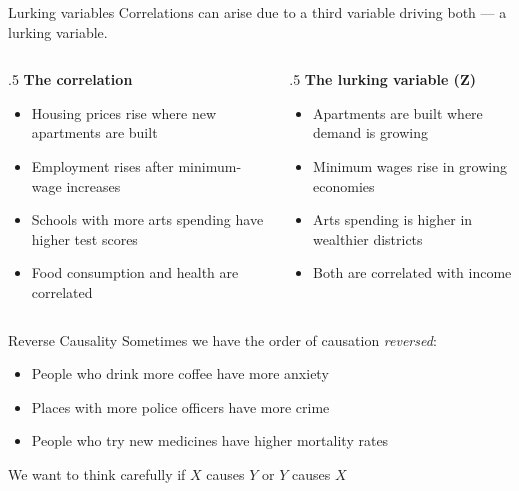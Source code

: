 \documentclass[aspectratio=169,t,11pt,table]{beamer}
\begin{document}
\begin{frame}{Lurking variables}
  Correlations can arise due to a third variable driving both — a \alert{lurking variable}.
  \begin{columns}[T]
    \begin{column}{.5\textwidth}
      \textbf{The correlation}
      \begin{itemize}
        \item Housing prices rise where new apartments are built
        \item Employment rises after minimum-wage increases
        \item Schools with more arts spending have higher test scores
        \item Food consumption and health are correlated
      \end{itemize}
    \end{column}
    \begin{column}{.5\textwidth}
      \textbf{The lurking variable ($\bm{Z}$)}
      \begin{itemize}
        \item Apartments are built where demand is growing
        \item Minimum wages rise in growing economies
        \item Arts spending is higher in wealthier districts
        \item Both are correlated with income
      \end{itemize}
    \end{column}
  \end{columns}
\end{frame}

\begin{frame}{Reverse Causality}
  Sometimes we have the order of causation \emph{reversed}:
  \begin{itemize}
    \item People who drink more coffee have more anxiety
    
    \item Places with more police officers have more crime 
    
    \item People who try new medicines have higher mortality rates
  \end{itemize}

  \bigskip
  We want to think carefully if $X$ causes $Y$ or $Y$ causes $X$
\end{frame}
\end{document}

